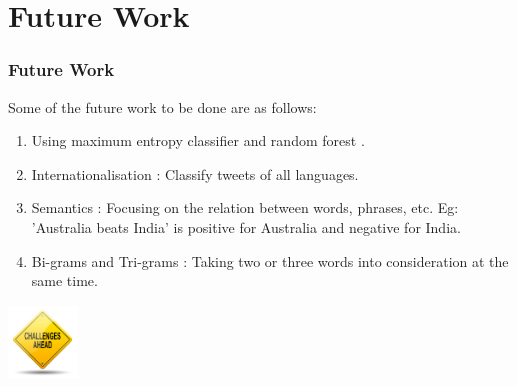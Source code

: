 \documentclass[12pt,xcolor=dvipsnames,table,titlepage]{beamer}
\begin{document}

\section{Future Work}
\begin{frame}[t]
\frametitle{Future Work}
Some of the future work to be done are as follows:
\begin{enumerate}
\item Using maximum entropy classifier and random forest \cite{rp8}.
\item Internationalisation \cite{rp3}: Classify tweets of all languages.
\item Semantics \cite{rp6}: Focusing on the relation between words, phrases, etc. Eg: 'Australia beats India' is positive for Australia and negative for India.
\item Bi-grams and Tri-grams \cite{rp7}: Taking two or three words into consideration at the same time.
\end{enumerate}
\begin{center}
\includegraphics[width=70, height=75]{img4.png} 
\end{center}

\end{frame}
\end{document}
